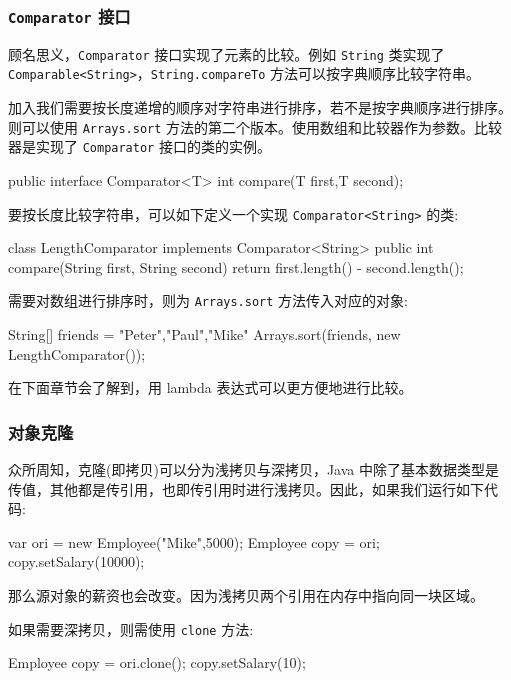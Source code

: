 \subsubsection{\texttt{Comparator} 接口}

顾名思义，\texttt{Comparator} 接口实现了元素的比较。例如 \texttt{String} 类实现了 \texttt{Comparable<String>}，\texttt{String.compareTo} 方法可以按字典顺序比较字符串。

加入我们需要按长度递增的顺序对字符串进行排序，若不是按字典顺序进行排序。则可以使用 \texttt{Arrays.sort} 方法的第二个版本。使用数组和比较器作为参数。比较器是实现了 \texttt{Comparator} 接口的类的实例。

\begin{Java}
public interface Comparator<T> {
    int compare(T first,T second);
}
\end{Java}

要按长度比较字符串，可以如下定义一个实现 \texttt{Comparator<String>} 的类:

\begin{Java}
class LengthComparator implements Comparator<String> {
    public int compare(String first, String second) {
        return first.length() - second.length();
    }
}
\end{Java}

需要对数组进行排序时，则为 \texttt{Arrays.sort} 方法传入对应的对象:
\begin{Java}
String[] friends = {"Peter","Paul","Mike"}
Arrays.sort(friends, new LengthComparator());
\end{Java}

在下面章节会了解到，用 lambda 表达式可以更方便地进行比较。

\subsubsection{对象克隆}

众所周知，克隆(即拷贝)可以分为浅拷贝与深拷贝，Java 中除了基本数据类型是传值，其他都是传引用，也即传引用时进行浅拷贝。因此，如果我们运行如下代码:

\begin{Java}
var ori = new Employee("Mike",5000);
Employee copy = ori;
copy.setSalary(10000);
\end{Java}

那么源对象的薪资也会改变。因为浅拷贝两个引用在内存中指向同一块区域。

如果需要深拷贝，则需使用 \texttt{clone} 方法:

\begin{Java}
Employee copy = ori.clone();
copy.setSalary(10);
\end{Java}

